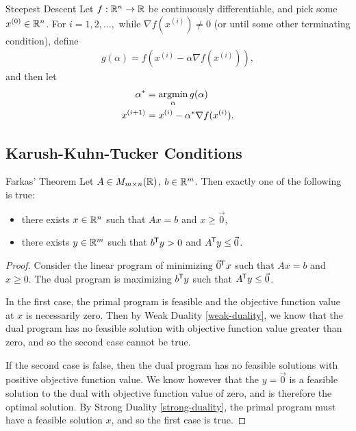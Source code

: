 \begin{defn}{Steepest Descent}\label{steepest-method}\proofbreak
    Let $f: \mathbb{R}^n \to \mathbb{R}$ be continuously differentiable, and pick some $x^{(0)} \in \mathbb{R}^n$. 
    For $i = 1, 2, \ldots, $ while $\nabla f(x^{(i)}) \neq 0$ (or until some other terminating condition), define
    \begin{align*}
        g(\alpha) = f(x^{(i)} - \alpha\nabla f(x^{(i)})),
    \end{align*}
    and then let
    \begin{align*}
        \alpha^* &= \operatorname*{argmin}_{\alpha}g(\alpha) \\
        x^{(i+1)} &= x^{(i)} - \alpha^{*}\nabla f(x^{(i)}).
    \end{align*}
\end{defn}

\subsection{Karush-Kuhn-Tucker Conditions}

\begin{thm}{Farkas' Theorem}\label{farkas}\proofbreak
    Let $A \in M_{m \times n}(\mathbb{R})$, $b \in \mathbb{R}^m$. Then exactly one of the following is true:
    \begin{itemize}
        \item there exists $x \in \mathbb{R}^n$ such that $Ax = b$ and $x \geq \vec{0}$,
        \item there exists $y \in \mathbb{R}^m$ such that ${b}^{\mkern-1.5mu\mathsf{T}}y > 0$ and ${A}^{\mkern-1.5mu\mathsf{T}}y \leq \vec{0}$.
    \end{itemize}
\end{thm}

\begin{proof}
    Consider the linear program of minimizing ${\vec{0}}^{\mkern-1.5mu\mathsf{T}}x$ such that $Ax = b$ and $x \geq {0}$. The dual program is maximizing ${b}^{\mkern-1.5mu\mathsf{T}}y$ such that ${A}^{\mkern-1.5mu\mathsf{T}}y \leq \vec{0}$.

    In the first case, the primal program is feasible and the objective function value at $x$ is necessarily zero. Then by Weak Duality \ref{weak-duality}, we know that the dual program has no feasible solution with objective function value greater than zero, and so the second case cannot be true.

    If the second case is false, then the dual program has no feasible solutions with positive objective function value. We know however that the $y = \vec{0}$ is a feasible solution to the dual with objective function value of zero, and is therefore the optimal solution. By Strong Duality \ref{strong-duality}, the primal program must have a feasible solution $x$, and so the first case is true.
\end{proof}

